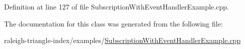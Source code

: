 Definition at line 127 of file Subscription\+With\+Event\+Handler\+Example.\+cpp.



The documentation for this class was generated from the following file\+:\begin{DoxyCompactItemize}
\item 
raleigh-\/triangle-\/index/examples/\hyperlink{_subscription_with_event_handler_example_8cpp}{Subscription\+With\+Event\+Handler\+Example.\+cpp}\end{DoxyCompactItemize}
